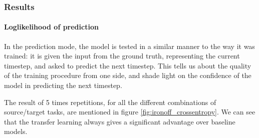     \subsubsection{Results}
    \paragraph{Loglikelihood of prediction}
      In the prediction mode, the model is tested in a similar manner to the way it was trained: it is given the input from the ground truth, representing the current timestep, and asked to predict the next timestep. This tells us about the quality of the training procedure from one side, and shade light on the confidence of the model in predicting the next timestep.

      The result of 5 times repetitions, for all the different combinations of source/target tasks, are mentioned in figure \ref{fig:ironoff_crossentropy}. We can see that the transfer learning always gives a significant advantage over baseline models.
